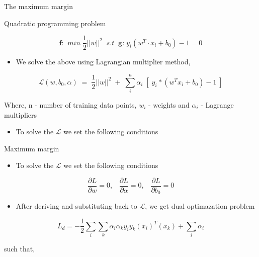 \documentclass{beamer}
\newcommand{\Lagr}{\mathcal{L}}
\begin{document}
\begin{frame}{The maximum margin}
\begin{block}{Quadratic programming problem}

\[\textbf{f:} \; \; min \;\frac{1}{2} ||w||^2 \; \; s.t \;\; \textbf{g:} \; y_i(w^T \cdot x_i + b_0) - 1 = 0
\]
\end{block}
\vspace{0.3cm}
\begin{itemize}
\item We solve the above using Lagrangian multiplier method, \displaystyle \Lagr
\end{itemize}

\begin{equation}
\displaystyle \Lagr (w, b_0,\alpha)  \; =\; \frac{1}{2}||w||^2 \; + \;  \sum_i^n \alpha_i  \;[\;y_i  *(w^T x_i  +b_0 )-1\;]   
\end{equation}

\hspace{0.3cm} Where, n - number of training data points, $w_i$ - weights and  $\alpha_i$ - Lagrange multipliers
\vspace{0.1cm}
\begin{itemize}
\item To solve the $\Lagr$ we set the following conditions
\end{itemize}
\end{frame}




\begin{frame}[t]{Maximum margin}
\vspace{0.2cm}
\begin{itemize}
\item To solve the $\Lagr$ we set the following conditions
\end{itemize}

\begin{equation}
\frac{\partial L}{\partial w} = 0, \; \; \; \frac{\partial L}{\partial \alpha} = 0 , \; \; \; \frac{\partial L}{\partial b_0} = 0
\end{equation}

\begin{itemize}
\item After deriving and substituting back to $\Lagr$, we get dual optimazation problem
\end{itemize}

\[
L_d = -\frac{1}{2} \sum_i \sum_k \alpha_i \alpha_k y_i y_k (x_i)^T (x_k) + \sum_i \alpha_i
\]

such that, 

\end{frame}
\end{document}
